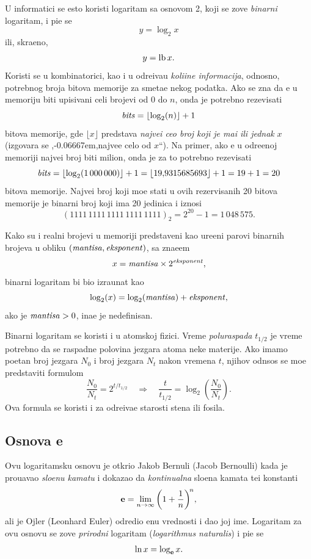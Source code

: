 \documentclass[12pt, twoside, a4paper]{article}
\def\navod#1{\relax,\kern-0.06667em,\relax#1\relax``\relax}
\def\logtwo{\log_2}
\def\puta{\times}
\def\.{\smash{,}\vphantom{.}}
\def\e{{\bf e}}
\def\th{t_{1/2}}
\def\sledi{{\quad\Rightarrow\quad}}
\begin{document}
U informatici se {\cv}esto koristi logaritam sa osnovom 2, koji se zove {\sl binarni\/} logaritam,
i pi{\sv}e se
$$
y=\logtwo x
$$
ili, skra{\cc}eno,
$$
y=\mathop{\rm lb} x.
$$
Koristi se u kombinatorici, kao i u odre{\dj}iva{\nj}u {\sl koli{\cv}ine informacija},
odnosno, potrebnog broja bitova me\-mo\-ri\-je za sme{\sv}ta{\nj}e nekog podatka.
Ako se zna da {\cc}e u me\-mo\-ri\-ju biti upisivani celi brojevi od 0 do $n$, onda je potrebno rezevisati
$$
\bits = \lfloor\logtwo(n)\rfloor+1
$$
bitova memorije, gde $\lfloor x\rfloor$ predstav{\lj}a {\sl najve{\cc}i ceo broj koji je ma{\nj}i ili jednak} $x$
(izgovara se \navod{najve{\cc}e celo od $x$}). 
Na primer, ako {\cc}e u odre{\dj}enoj memoriji najve{\cc}i 
broj biti milion, onda je za to potrebno rezevisati
$$
\bits=\lfloor\logtwo(1\,000\,000)\rfloor+1=\lfloor 19\.9315685693\rfloor+1 = 19+1=20
$$
bitova memorije. Najve{\cc}i broj koji mo{\zv}e stati u ovih rezervisanih 20 bitova memorije je binarni broj koji ima 20 jedinica
i iznosi 
$$
(1111\,1111\,1111\,1111\,1111)_2=
2^{20}-1=1\,048\,575.
$$

Kako su i realni brojevi u memoriji predstav{\lj}eni kao ure{\dj}eni parovi binarnih brojeva u obliku
$({\it mantisa},{\it eksponent})$, sa zna{\cv}e{\nj}em
$$
x=\mant\puta2^\expo,
$$
binarni logaritam bi bio izra{\cv}unat kao
$$
\logtwo(x)=\logtwo(\mant)+\expo,
$$
ako je ${\it mantisa}>0$, ina{\cv}e je nedefinisan.

\smallskip

Binarni logaritam se koristi i u atomskoj fizici.
Vreme {\sl poluraspada\/} $\th$ je vreme potrebno da se raspadne polovina jezgara atoma neke materije. 
Ako imamo po{\cv}etan broj jezgara $N_0$ i broj jezgara $N_t$ nakon vremena $t$, njihov odnsos
se mo{\zv}e pred\-sta\-vi\-ti formulom
\begin{equation}
\label{eq:halftime}
\frac{N_0}{N_t}=2^{t/\th}\sledi \frac{t}{\th}=\logtwo\left( \frac{N_0}{N_t} \right).
\end{equation}
Ova formula se koristi i za odre{\dj}iva{\nj}e starosti stena ili fosila.



\subsection{Osnova \e}

Ovu logaritamsku osnovu je otkrio Jakob Bernuli (Jacob Bernoulli) kada je
prou{\cv}avao {\sl slo{\zv}enu kamatu\/} i dokazao da {\sl kontinualna\/} slo{\zv}ena kamata
te{\zv}i konstanti
$$
\e=\lim_{n\to\infty}\left(1+\frac1n\right)^{\!n}\!,
$$
ali je Ojler (Leonhard Euler)
odredio {\nj}enu vrednosti i dao joj ime.
Logaritam za ovu osnovu se zove {\sl prirodni\/} logaritam ({\sl logarithmus naturalis\/})
i pi{\sv}e se
$$
\ln x=\log_\e x.
$$
\end{document}
